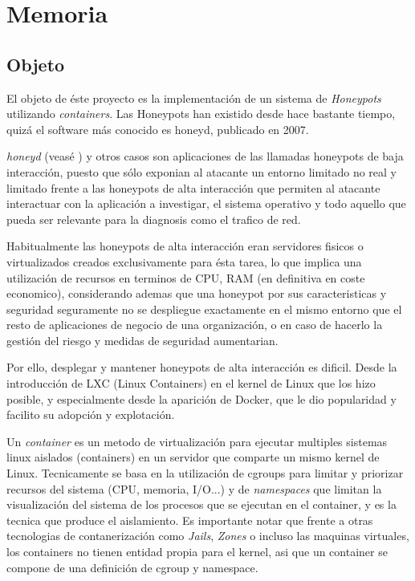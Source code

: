 \chapter{Memoria}
\minitoc{}
\section{Objeto}
El objeto de éste proyecto es la implementación de un sistema de \emph{Honeypots} utilizando \emph{containers}. 
Las Honeypots han existido desde hace bastante tiempo, quizá el software más conocido es honeyd, publicado en 2007.

\emph{honeyd} (veasé \cite{honeynet-lowinteraction}) y otros casos son aplicaciones de las llamadas honeypots de baja interacción, puesto que sólo exponian al atacante un entorno limitado
no real y limitado frente a las honeypots de alta interacción que permiten al atacante interactuar con la aplicación a investigar, el sistema operativo
y todo aquello que pueda ser relevante para la diagnosis como el trafico de red.

Habitualmente las honeypots de alta interacción eran servidores fisicos o virtualizados creados exclusivamente para ésta tarea, lo que implica
una utilización de recursos en terminos de CPU, RAM (en definitiva en coste economico), considerando ademas que una honeypot por sus caracteristicas
y seguridad seguramente no se despliegue exactamente en el mismo entorno que el resto de aplicaciones de negocio de una organización, o en caso de hacerlo
la gestión del riesgo y medidas de seguridad aumentarian.

Por ello, desplegar y mantener honeypots de alta interacción es dificil. Desde la introducción de LXC (Linux Containers) en el kernel de Linux que los hizo posible, y
especialmente desde la aparición de Docker, que le dio popularidad y facilito su adopción y explotación.

Un \emph{container} es un metodo de virtualización para ejecutar multiples sistemas linux aislados (containers) en un servidor que comparte un mismo kernel de Linux. Tecnicamente se basa en la utilización
de cgroups para limitar y priorizar recursos del sistema (CPU, memoria, I/O...) y de \emph{namespaces} que limitan la visualización del sistema de los procesos que se ejecutan en el container, y es la tecnica que produce el aislamiento. Es importante notar que
frente a otras tecnologias de contanerización como \emph{Jails}, \emph{Zones} o incluso las maquinas virtuales, los containers no tienen entidad propia para el kernel, asi que un container se compone
de una definición de cgroup y namespace. 


